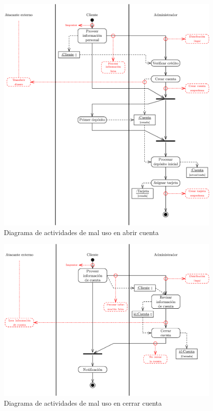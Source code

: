 \begin{figure}[htp!]
\centering
    	\includegraphics[scale=0.55]{Imagenes/diag_activity_openAccount_misuse_esp.eps}
 	\caption{Diagrama de actividades de mal uso en abrir cuenta}
	\label{CU1_misuse}
\end{figure}

\begin{figure}[htp!]
\centering
    	\includegraphics[scale=0.55]{Imagenes/diag_activity_closeAccount_misuse_esp.eps}
 	\caption{Diagrama de actividades de mal uso en cerrar cuenta}
	\label{CU2_misuse}
\end{figure}

